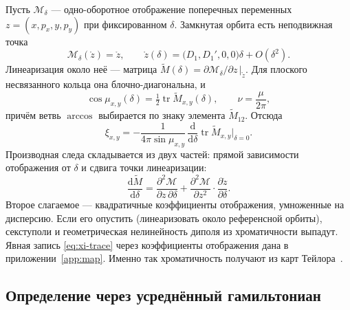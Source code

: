 Пусть $\mathcal{M}_\delta$ --- одно-оборотное отображение поперечных переменных $z=(x,p_x,y,p_y)$ при фиксированном $\delta$. Замкнутая орбита есть неподвижная точка
\begin{equation}
\label{eq:fixed}
\mathcal{M}_\delta(\mathring z)=\mathring z,
\qquad
\mathring z(\delta)=\bigl(D_1,D_1',0,0\bigr)\delta+O(\delta^2).
\end{equation}
Линеаризация около неё --- матрица $\tilde M(\delta)=\partial\mathcal{M}_\delta/\partial z\,|_{\mathring z}$. Для плоского несвязанного кольца она блочно-диагональна, и
\begin{equation}
\label{eq:nu-trace}
\cos\mu_{x,y}(\delta)=\tfrac12\operatorname{tr}\tilde M_{x,y}(\delta),
\qquad
\nu=\frac{\mu}{2\pi},
\end{equation}
причём ветвь $\arccos$ выбирается по знаку элемента $\tilde M_{12}$. Отсюда
\begin{equation}
\label{eq:xi-trace}
\xi_{x,y}=-\frac{1}{4\pi\sin\mu_{x,y}}\,
\frac{\mathrm{d}}{\mathrm{d}\delta}\operatorname{tr}\tilde M_{x,y}\Big|_{\delta=0}.
\end{equation}
Производная следа складывается из двух частей: прямой зависимости отображения от $\delta$ и сдвига точки линеаризации:
\begin{equation}
\label{eq:dM}
\frac{\mathrm{d}\tilde M}{\mathrm{d}\delta}
=\frac{\partial^2\mathcal{M}}{\partial z\,\partial\delta}
+\frac{\partial^2\mathcal{M}}{\partial z^2}\cdot\frac{\partial\mathring z}{\partial\delta}.
\end{equation}
Второе слагаемое --- квадратичные коэффициенты отображения, умноженные на дисперсию. Если его опустить (линеаризовать около референсной орбиты), секступоли и геометрическая нелинейность диполя из хроматичности выпадут. Явная запись \eqref{eq:xi-trace} через коэффициенты отображения дана в приложении~\ref{app:map}. Именно так хроматичность получают из карт Тейлора~\cite{ValetovPhD,ValetovChrom2026}.

\subsection{Определение через усреднённый гамильтониан}

